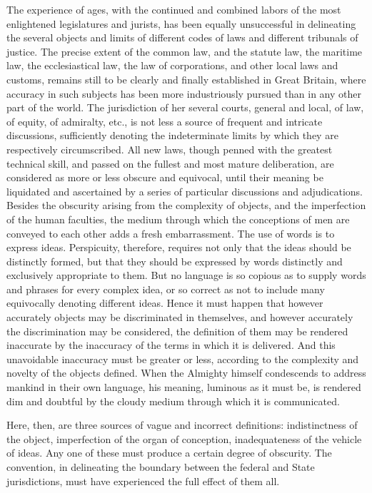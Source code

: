 The experience of ages, with the continued and combined labors of the most enlightened legislatures and jurists, has been equally unsuccessful in delineating the several objects and limits of different codes of laws and different tribunals of justice. The precise extent of the common law, and the statute law, the maritime law, the ecclesiastical law, the law of corporations, and other local laws and customs, remains still to be clearly and finally established in Great Britain, where accuracy in such subjects has been more industriously pursued than in any other part of the world. The jurisdiction of her several courts, general and local, of law, of equity, of admiralty, etc., is not less a source of frequent and intricate discussions, sufficiently denoting the indeterminate limits by which they are respectively circumscribed. All new laws, though penned with the greatest technical skill, and passed on the fullest and most mature deliberation, are considered as more or less obscure and equivocal, until their meaning be liquidated and ascertained by a series of particular discussions and adjudications. Besides the obscurity arising from the complexity of objects, and the imperfection of the human faculties, the medium through which the conceptions of men are conveyed to each other adds a fresh embarrassment. The use of words is to express ideas. Perspicuity, therefore, requires not only that the ideas should be distinctly formed, but that they should be expressed by words distinctly and exclusively appropriate to them. But no language is so copious as to supply words and phrases for every complex idea, or so correct as not to include many equivocally denoting different ideas. Hence it must happen that however accurately objects may be discriminated in themselves, and however accurately the discrimination may be considered, the definition of them may be rendered inaccurate by the inaccuracy of the terms in which it is delivered. And this unavoidable inaccuracy must be greater or less, according to the complexity and novelty of the objects defined. When the Almighty himself condescends to address mankind in their own language, his meaning, luminous as it must be, is rendered dim and doubtful by the cloudy medium through which it is communicated.

Here, then, are three sources of vague and incorrect definitions: indistinctness of the object, imperfection of the organ of conception, inadequateness of the vehicle of ideas. Any one of these must produce a certain degree of obscurity. The convention, in delineating the boundary between the federal and State jurisdictions, must have experienced the full effect of them all.

